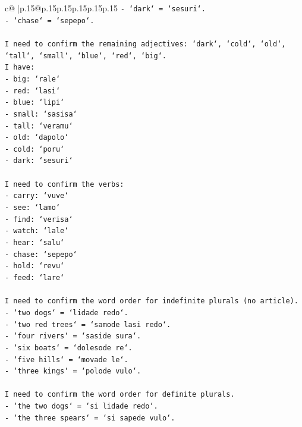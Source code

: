 \documentclass{article}
\begin{document}
{\begin{supertabular}{c@{$\;$}|p{.15\linewidth}@{}p{.15\linewidth}p{.15\linewidth}p{.15\linewidth}p{.15\linewidth}p{.15\linewidth}}
{{{\texttt{{-} `dark` = `sesuri`.} \\
\texttt{{-} `chase` = `sepepo`.} \\
\\ 
\texttt{I need to confirm the remaining adjectives: `dark`, `cold`, `old`, `tall`, `small`, `blue`, `red`, `big`.} \\
\texttt{I have:} \\
\texttt{{-} big: `rale`} \\
\texttt{{-} red: `lasi`} \\
\texttt{{-} blue: `lipi`} \\
\texttt{{-} small: `sasisa`} \\
\texttt{{-} tall: `veramu`} \\
\texttt{{-} old: `dapolo`} \\
\texttt{{-} cold: `poru`} \\
\texttt{{-} dark: `sesuri`} \\
\\ 
\texttt{I need to confirm the verbs:} \\
\texttt{{-} carry: `vuve`} \\
\texttt{{-} see: `lamo`} \\
\texttt{{-} find: `verisa`} \\
\texttt{{-} watch: `lale`} \\
\texttt{{-} hear: `salu`} \\
\texttt{{-} chase: `sepepo`} \\
\texttt{{-} hold: `revu`} \\
\texttt{{-} feed: `lare`} \\
\\ 
\texttt{I need to confirm the word order for indefinite plurals (no article).} \\
\texttt{{-} `two dogs` = `lidade redo`.} \\
\texttt{{-} `two red trees` = `samode lasi redo`.} \\
\texttt{{-} `four rivers` = `saside sura`.} \\
\texttt{{-} `six boats` = `dolesode re`.} \\
\texttt{{-} `five hills` = `movade le`.} \\
\texttt{{-} `three kings` = `polode vulo`.} \\
\\ 
\texttt{I need to confirm the word order for definite plurals.} \\
\texttt{{-} `the two dogs` = `si lidade redo`.} \\
\texttt{{-} `the three spears` = `si sapede vulo`.} \\
}}}
\end{supertabular}}
\end{document}
